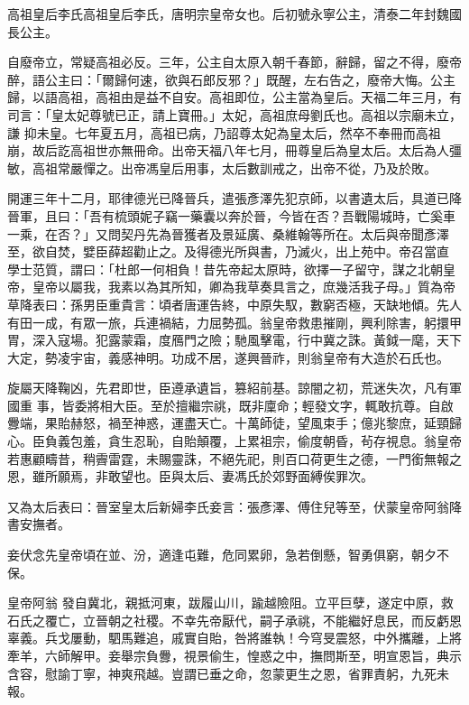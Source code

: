 
\begin{pinyinscope}

 高祖皇后李氏高祖皇后李氏，唐明宗皇帝女也。后初號永寧公主，清泰二年封魏國長公主。



 自廢帝立，常疑高祖必反。三年，公主自太原入朝千春節，辭歸，留之不得，廢帝醉，語公主曰：「爾歸何速，欲與石郎反邪？」既醒，左右告之，廢帝大悔。公主歸，以語高祖，高祖由是益不自安。高祖即位，公主當為皇后。天福二年三月，有司言：「皇太妃尊號已正，請上寶冊。」太妃，高祖庶母劉氏也。高祖以宗廟未立，謙
 抑未皇。七年夏五月，高祖已病，乃詔尊太妃為皇太后，然卒不奉冊而高祖崩，故后訖高祖世亦無冊命。出帝天福八年七月，冊尊皇后為皇太后。太后為人彊敏，高祖常嚴憚之。出帝馮皇后用事，太后數訓戒之，出帝不從，乃及於敗。



 開運三年十二月，耶律德光已降晉兵，遣張彥澤先犯京師，以書遺太后，具道已降晉軍，且曰：「吾有梳頭妮子竊一藥囊以奔於晉，今皆在否？吾戰陽城時，亡奚車一乘，在否？」又問契丹先為晉獲者及景延廣、桑維翰等所在。太后與帝聞彥澤至，欲自焚，嬖臣薛超勸止之。及得德光所與書，乃滅火，出上苑中。帝召當直
 學士范質，謂曰：「杜郎一何相負！昔先帝起太原時，欲擇一子留守，謀之北朝皇帝，皇帝以屬我，我素以為其所知，卿為我草奏具言之，庶幾活我子母。」質為帝草降表曰：孫男臣重貴言：頃者唐運告終，中原失馭，數窮否極，天缺地傾。先人有田一成，有眾一旅，兵連禍結，力屈勢孤。翁皇帝救患摧剛，興利除害，躬擐甲胃，深入寇場。犯露蒙霜，度鴈門之險；馳風擊電，行中冀之誅。黃鉞一麾，天下大定，勢凌宇宙，義感神明。功成不居，遂興晉祚，則翁皇帝有大造於石氏也。



 旋屬天降鞠凶，先君即世，臣遵承遺旨，篡紹前基。諒闇之初，荒迷失次，凡有軍國重
 事，皆委將相大臣。至於擅繼宗祧，既非廩命；輕發文字，輒敢抗尊。自啟釁端，果貽赫怒，禍至神惑，運盡天亡。十萬師徒，望風束手；億兆黎庶，延頸歸心。臣負義包羞，貪生忍恥，自貽顛覆，上累祖宗，偷度朝昏，茍存視息。翁皇帝若惠顧疇昔，稍霽雷霆，未賜靈誅，不絕先祀，則百口荷更生之德，一門銜無報之恩，雖所願焉，非敢望也。臣與太后、妻馮氏於郊野面縛俟罪次。



 又為太后表曰：晉室皇太后新婦李氏妾言：張彥澤、傅住兒等至，伏蒙皇帝阿翁降書安撫者。



 妾伏念先皇帝頃在並、汾，適逢屯難，危同累卵，急若倒懸，智勇俱窮，朝夕不保。



 皇帝阿翁
 發自冀北，親抵河東，跋履山川，踰越險阻。立平巨孽，遂定中原，救石氏之覆亡，立晉朝之社稷。不幸先帝厭代，嗣子承祧，不能繼好息民，而反虧恩辜義。兵戈屢動，駟馬難追，戚實自貽，咎將誰執！今穹旻震怒，中外攜離，上將牽羊，六師解甲。妾舉宗負釁，視景偷生，惶惑之中，撫問斯至，明宣恩旨，典示含容，慰諭丁寧，神爽飛越。豈謂已垂之命，忽蒙更生之恩，省罪責躬，九死未報。




\end{pinyinscope}
